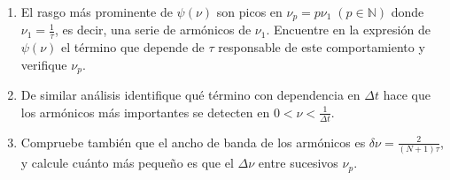 \begin{enumerate}
	\item El rasgo más prominente de \(\psi(\nu)\) son picos en \(\nu_p = p \nu_1 \; (p \in \mathbb{N})\) donde \(\nu_1 = \frac{1}{\tau}\), es decir, una serie de armónicos de \(\nu_1\).
	Encuentre en la expresión de \(\psi(\nu)\) el término que depende de \(\tau\) responsable de este comportamiento y verifique \(\nu_p\). 
	
	\item De similar análisis identifique qué término con dependencia en \(\Delta t\) hace que los armónicos más importantes se detecten en \(0 < \nu < \frac{1}{\Delta t}\).

	\item Compruebe también que el ancho de banda de los armónicos es \(\delta \nu = \frac{2}{(N+1) \tau}\), y calcule cuánto más pequeño es que el $\Delta \nu$ entre sucesivos $\nu_p$.
\end{enumerate}
